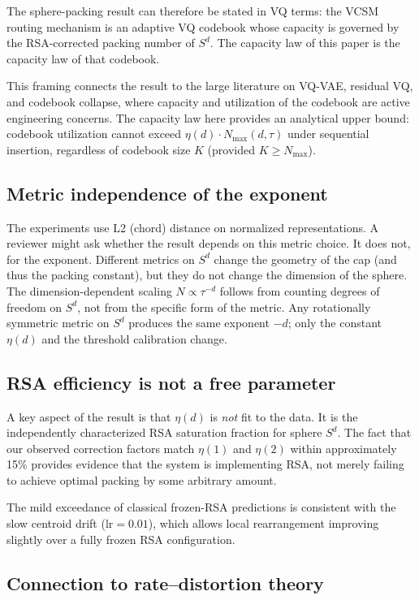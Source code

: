 \documentclass[11pt]{article}
\begin{document}
The sphere-packing result can therefore be stated in VQ terms: the VCSM
routing mechanism is an adaptive VQ codebook whose capacity is governed by
the RSA-corrected packing number of $S^{d}$.
The capacity law of this paper is the capacity law of that codebook.

This framing connects the result to the large literature on VQ-VAE, residual
VQ, and codebook collapse, where capacity and utilization of the codebook are
active engineering concerns.
The capacity law here provides an analytical upper bound: codebook utilization
cannot exceed $\eta(d) \cdot N_{\max}(d, \tau)$ under sequential insertion,
regardless of codebook size $K$ (provided $K \geq N_{\max}$).

\subsection{Metric independence of the exponent}

The experiments use L2 (chord) distance on normalized representations.
A reviewer might ask whether the result depends on this metric choice.
It does not, for the exponent.
Different metrics on $S^d$ change the geometry of the cap (and thus the
packing constant), but they do not change the dimension of the sphere.
The dimension-dependent scaling $N \propto \tau^{-d}$ follows from counting
degrees of freedom on $S^d$, not from the specific form of the metric.
Any rotationally symmetric metric on $S^d$ produces the same exponent $-d$;
only the constant $\eta(d)$ and the threshold calibration change.

\subsection{RSA efficiency is not a free parameter}

A key aspect of the result is that $\eta(d)$ is \emph{not} fit to the data.
It is the independently characterized RSA saturation fraction for sphere
$S^d$.
The fact that our observed correction factors match $\eta(1)$ and $\eta(2)$
within approximately 15\% provides evidence that the system is implementing
RSA, not merely failing to achieve optimal packing by some arbitrary amount.

The mild exceedance of classical frozen-RSA predictions is consistent with
the slow centroid drift ($\mathrm{lr}=0.01$), which allows local
rearrangement improving slightly over a fully frozen RSA configuration.

\subsection{Connection to rate--distortion theory}
\end{document}
